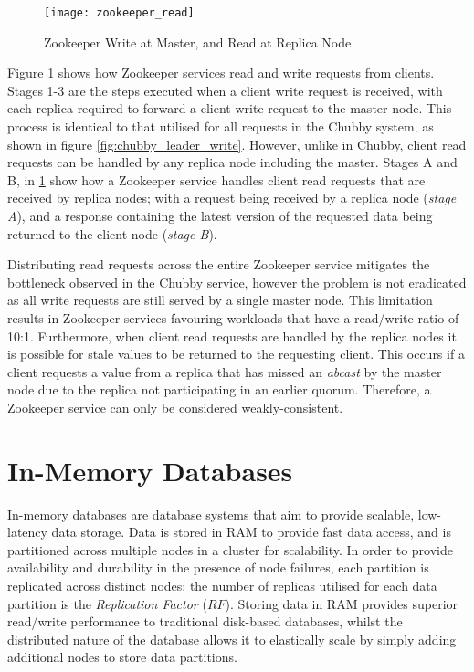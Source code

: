 \begin{figure}[htbp!] 
	    \centering    
	    \texttt{[image: zookeeper\_read]}
	    \caption[Zookeeper Read and Write Requests]{Zookeeper Write at Master, and Read at Replica Node}
	    \label{fig:zookeeper_read}
	\end{figure}	 	
	
    Figure \ref{fig:zookeeper_read} shows how Zookeeper services read and write requests from clients.  Stages 1-3 are the steps executed when a client write request is received, with each replica required to forward a client write request to the master node.  This process is identical to that utilised for all requests in the Chubby system, as shown in figure \ref{fig:chubby_leader_write}.  However, unlike in Chubby, client read requests can be handled by any replica node including the master.  Stages A and B, in \ref{fig:zookeeper_read} show how a Zookeeper service handles client read requests that are received by replica nodes; with a request being received by a replica node (\emph{stage A}), and a response containing the latest version of the requested data being returned to the client node (\emph{stage B}).  

	Distributing read requests across the entire Zookeeper service mitigates the bottleneck observed in the Chubby service, however the problem is not eradicated as all write requests are still served by a single master node.  This limitation results in Zookeeper services favouring workloads that have a read/write ratio of 10:1. Furthermore, when client read requests are handled by the replica nodes it is possible for stale values to be returned to the requesting client.  This occurs if a client requests a value from a replica that has missed an \emph{abcast} by the master node due to the replica not participating in an earlier quorum.  Therefore, a Zookeeper service can only be considered weakly-consistent.   

\clearpage
\section{In-Memory Databases}
In-memory databases\citep{Infinispan, Hazelcast, GridGain, OracleCoherence, PivotalGemFire, Schiper:2010:PGP:1915085.1916444} are database systems that aim to provide scalable, low-latency data storage.  Data is stored in RAM to provide fast data access, and is partitioned across multiple nodes in a cluster for scalability.  In order to provide availability and durability in the presence of node failures, each partition is replicated across distinct nodes; the number of replicas utilised for each data partition is the \emph{Replication Factor} ($RF$).  Storing data in RAM provides superior read/write performance to traditional disk-based databases, whilst the distributed nature of the database allows it to elastically scale by simply adding additional nodes to store data partitions.  

